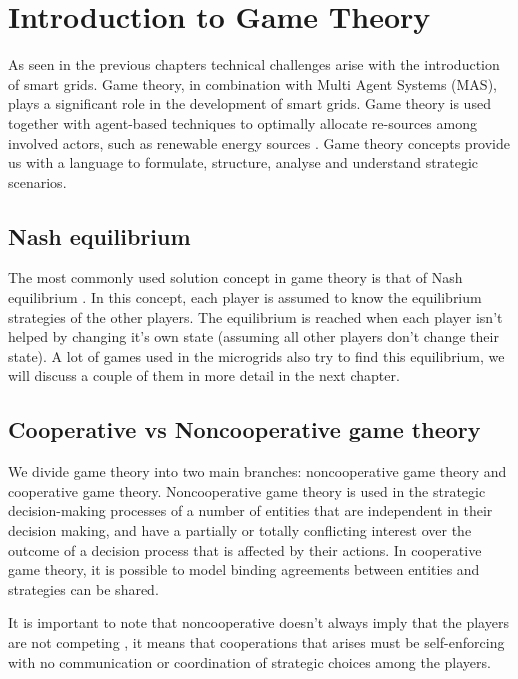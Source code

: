 \section{Introduction to Game Theory}
As seen in the previous chapters technical challenges arise with the introduction of smart grids. Game theory, in combination with Multi Agent Systems (MAS), plays a significant role in the development of smart grids. Game theory is used together with agent-based techniques to optimally allocate re-sources among involved actors, such as renewable energy sources \cite{nguyen2013game}. Game theory concepts provide us with a language to formulate, structure, analyse and understand strategic scenarios.

\subsection{Nash equilibrium}
The most commonly used solution concept in game theory is that of Nash equilibrium \cite{CourseInGameTheory}. In this concept, each player is assumed to know the equilibrium strategies of the other players. The equilibrium is reached when each player isn't helped by changing it's own state (assuming all other players don't change their state). A lot of games used in the microgrids also try to find this equilibrium, we will discuss a couple of them in more detail in the next chapter.

\subsection{Cooperative vs Noncooperative game theory}
We divide game theory into two main branches: noncooperative game theory and cooperative game theory. Noncooperative game theory is used in the strategic decision-making processes of a number of entities that are independent in their decision making, and have a partially or totally conflicting interest over the outcome of a decision process that is affected by their actions\cite{keypaper}. In cooperative game theory, it is possible to model binding agreements between entities and strategies can be shared. 

It is important to note that noncooperative doesn't always imply that the players are not competing , it means that cooperations that arises must be self-enforcing with no communication or coordination of strategic choices among the players.\cite{keypaper}

